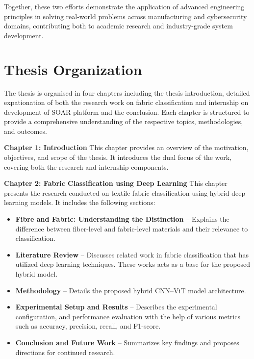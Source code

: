 \documentclass[12pt, twoside, a4paper]{report}
\begin{document}
Together, these two efforts demonstrate the application of advanced engineering principles in solving real-world problems across manufacturing and cybersecurity domains, contributing both to academic research and industry-grade system development.





\section*{Thesis Organization}

The thesis is organised in four chapters including the thesis introduction, detailed expationation of both the research work on fabric classification and internship on development of SOAR platform and the conclusion. Each chapter is structured to provide a comprehensive understanding of the respective topics, methodologies, and outcomes.

\textbf{Chapter 1: Introduction}  
This chapter provides an overview of the motivation, objectives, and scope of the thesis. It introduces the dual focus of the work, covering both the research and internship components.

\textbf{Chapter 2: Fabric Classification using Deep Learning}  
This chapter presents the research conducted on textile fabric classification using hybrid deep learning models. It includes the following sections:
\begin{itemize}[noitemsep, topsep=0pt]
    \item \textbf{Fibre and Fabric: Understanding the Distinction} – Explains the difference between fiber-level and fabric-level materials and their relevance to classification.
    \item \textbf{Literature Review} – Discusses related work in fabric classification that has utilized deep learning techniques. These works acts as a base for the proposed hybrid model.
    \item \textbf{Methodology} – Details the proposed hybrid CNN–ViT model architecture.
    \item \textbf{Experimental Setup and Results} – Describes the experimental configuration, and performance evaluation with the help of various metrics such as accuracy, precision, recall, and F1-score.
    \item \textbf{Conclusion and Future Work} – Summarizes key findings and proposes directions for continued research.
\end{itemize}
\end{document}
